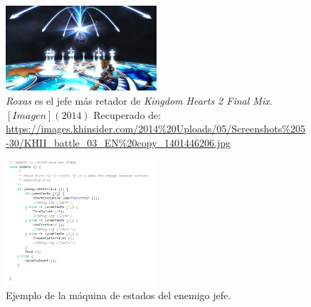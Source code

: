             \begin{figure}[h]
                \centering
                \includegraphics[width=0.5\textwidth]{03TrabajoRealizado/imagenes/RoxasBoss.jpg}
                \caption{\textit{Roxas} es el jefe más retador de \textit{Kingdom Hearts 2 Final Mix}. $ [Imagen] (2014)$ Recuperado de: \url{https://images.khinsider.com/2014\%20Uploads/05/Screenshots\%205-30/KHII_battle_03_EN\%20copy_1401446206.jpg}}
                \label{fig:Roxas}
            \end{figure}

            \begin{figure}[h]
                \centering
                \includegraphics[width=0.5\textwidth]{03TrabajoRealizado/imagenes/ActualMaquinaJefe.png}
                \caption{Ejemplo de la máquina de estados del enemigo jefe.}
                \label{fig:EnemyMaquina}
            \end{figure}

